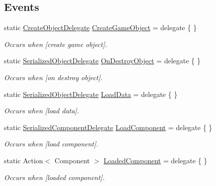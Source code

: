 \subsection*{Events}
\begin{DoxyCompactItemize}
\item 
static \hyperlink{class_level_loader_a251c136aac0e65fff5fef1c339fad356}{Create\+Object\+Delegate} \hyperlink{class_level_loader_a6467f227c2897f195d6c9f611d816cca}{Create\+Game\+Object} = delegate \{ \}
\begin{DoxyCompactList}\small\item\em Occurs when \mbox{[}create game object\mbox{]}. \end{DoxyCompactList}\item 
static \hyperlink{class_level_loader_a4483f031503dac772decbd9beedd784a}{Serialized\+Object\+Delegate} \hyperlink{class_level_loader_a5cdf0c07cc677bd052a4e4b11799eccc}{On\+Destroy\+Object} = delegate \{ \}
\begin{DoxyCompactList}\small\item\em Occurs when \mbox{[}on destroy object\mbox{]}. \end{DoxyCompactList}\item 
static \hyperlink{class_level_loader_a4483f031503dac772decbd9beedd784a}{Serialized\+Object\+Delegate} \hyperlink{class_level_loader_ae3f1e9846c9d625dfd2c522d35e5fa29}{Load\+Data} = delegate \{ \}
\begin{DoxyCompactList}\small\item\em Occurs when \mbox{[}load data\mbox{]}. \end{DoxyCompactList}\item 
static \hyperlink{class_level_loader_a233f68062303e5e0876c93646a9215ba}{Serialized\+Component\+Delegate} \hyperlink{class_level_loader_aeef57ebb788135e95410d8530a025403}{Load\+Component} = delegate \{ \}
\begin{DoxyCompactList}\small\item\em Occurs when \mbox{[}load component\mbox{]}. \end{DoxyCompactList}\item 
static Action$<$ Component $>$ \hyperlink{class_level_loader_a7db5619e1031ce444bcd94441ee4d1ac}{Loaded\+Component} = delegate \{ \}
\begin{DoxyCompactList}\small\item\em Occurs when \mbox{[}loaded component\mbox{]}. \end{DoxyCompactList}\end{DoxyCompactItemize}


